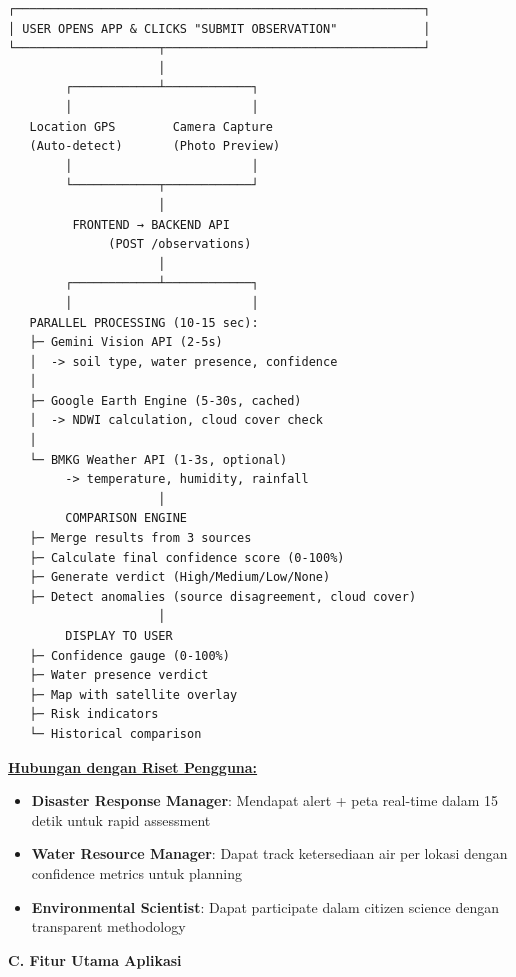\documentclass[12pt,a4paper]{article}
\newcommand{\subsectionbox}[1]{%
  \textbf{\large #1}\\[0.3cm]
}
\begin{document}
\begin{verbatim}
┌─────────────────────────────────────────────────────────┐
│ USER OPENS APP & CLICKS "SUBMIT OBSERVATION"            │
└────────────────────┬────────────────────────────────────┘
                     │
        ┌────────────┴────────────┐
        │                         │
   Location GPS        Camera Capture
   (Auto-detect)       (Photo Preview)
        │                         │
        └────────────┬────────────┘
                     │
         FRONTEND → BACKEND API
              (POST /observations)
                     │
        ┌────────────┴────────────┐
        │                         │
   PARALLEL PROCESSING (10-15 sec):
   ├─ Gemini Vision API (2-5s)
   │  -> soil type, water presence, confidence
   │
   ├─ Google Earth Engine (5-30s, cached)
   │  -> NDWI calculation, cloud cover check
   │
   └─ BMKG Weather API (1-3s, optional)
        -> temperature, humidity, rainfall
                     │
        COMPARISON ENGINE
   ├─ Merge results from 3 sources
   ├─ Calculate final confidence score (0-100%)
   ├─ Generate verdict (High/Medium/Low/None)
   ├─ Detect anomalies (source disagreement, cloud cover)
                     │
        DISPLAY TO USER
   ├─ Confidence gauge (0-100%)
   ├─ Water presence verdict
   ├─ Map with satellite overlay
   ├─ Risk indicators
   └─ Historical comparison
\end{verbatim}

\vspace{0.3cm}

\textbf{\underline{Hubungan dengan Riset Pengguna:}}

\begin{itemize}
  \item \textbf{Disaster Response Manager}: Mendapat alert + peta real-time dalam 15 detik untuk rapid assessment
  \item \textbf{Water Resource Manager}: Dapat track ketersediaan air per lokasi dengan confidence metrics untuk planning
  \item \textbf{Environmental Scientist}: Dapat participate dalam citizen science dengan transparent methodology
\end{itemize}

\subsectionbox{C. Fitur Utama Aplikasi}
\end{document}
